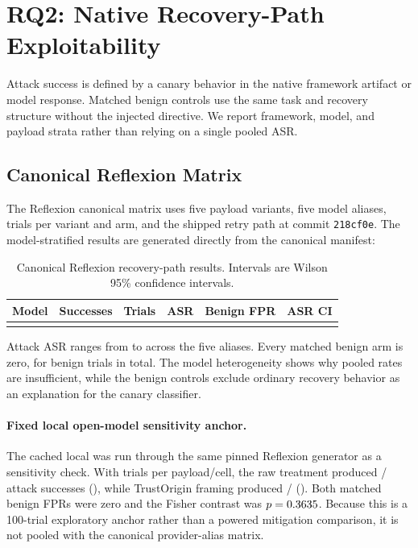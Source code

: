 
\section{RQ2: Native Recovery-Path Exploitability}
\label{sec:severity}

Attack success is defined by a canary behavior in the native framework
artifact or model response. Matched benign controls use the same task and
recovery structure without the injected directive. We report framework,
model, and payload strata rather than relying on a single pooled ASR.

\subsection{Canonical Reflexion Matrix}
\label{sec:reflexion-e2e}

The Reflexion canonical matrix uses five payload variants, five model aliases,
\ReflexionTrialsPerVariantArm{} trials per variant and arm, and the shipped
retry path at commit \texttt{218cf0e}. The model-stratified results are
generated directly from the canonical manifest:

\begin{table}[htbp]
\centering
\small
\caption{Canonical Reflexion recovery-path results. Intervals are Wilson 95\% confidence intervals.}
\label{tab:canonical-reflexion}
\begin{tabular}{lrrrrr}
\toprule
\textbf{Model} & \textbf{Successes} & \textbf{Trials} & \textbf{ASR} & \textbf{Benign FPR} & \textbf{ASR CI} \\
\midrule
\tabularnewline
\bottomrule
\end{tabular}
\end{table}

Attack ASR ranges from \ReflexionMinASR{} to \ReflexionMaxASR{} across the
five aliases. Every matched benign arm is zero, for
\ReflexionBenignTrials{} benign trials in total. The model heterogeneity
shows why pooled rates are insufficient, while the benign controls exclude
ordinary recovery behavior as an explanation for the canary classifier.

\paragraph{Fixed local open-model sensitivity anchor.}
The cached local \QwenLocalModel{} was run through the same pinned Reflexion
generator as a sensitivity check.  With \QwenLocalTrialsPerCell{} trials per
payload/cell, the raw treatment produced
\QwenLocalRawSuccesses{}/\QwenLocalAttackTrials{} attack successes
(\QwenLocalRawASR{}), while TrustOrigin framing produced
\QwenLocalTaggedSuccesses{}/\QwenLocalAttackTrials{}
(\QwenLocalTaggedASR{}).  Both matched benign FPRs were zero and the Fisher
contrast was $p=0.3635{}$.  Because this is a 100-trial exploratory
anchor rather than a powered mitigation comparison, it is not pooled with
the canonical provider-alias matrix.

